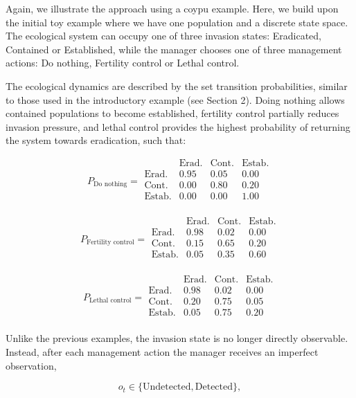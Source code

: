 \documentclass[
  11pt,
  a4paper,
]{article}
\begin{document}
Again, we illustrate the approach using a coypu example. Here, we build upon the initial toy example where we have one population and a discrete state space. The ecological system can occupy one of three invasion states: Eradicated, Contained or Established, while the manager chooses one of three management actions: Do nothing, Fertility control or Lethal control.

The ecological dynamics are described by the set transition probabilities, similar to those used in the introductory example (see Section 2). Doing nothing allows contained populations to become established, fertility control partially reduces invasion pressure, and lethal control provides the highest probability of returning the system towards eradication, such that:

\[
P_{\text{Do nothing}} =
\begin{array}{c|ccc}
 & \text{Erad.} & \text{Cont.} & \text{Estab.} \\
\hline
\text{Erad.} & 0.95 & 0.05 & 0.00 \\
\text{Cont.} & 0.00 & 0.80 & 0.20 \\
\text{Estab.} & 0.00 & 0.00 & 1.00 \\
\end{array}
\]

\[
P_{\text{Fertility control}} =
\begin{array}{c|ccc}
 & \text{Erad.} & \text{Cont.} & \text{Estab.} \\
\hline
\text{Erad.} & 0.98 & 0.02 & 0.00 \\
\text{Cont.} & 0.15 & 0.65 & 0.20 \\
\text{Estab.} & 0.05 & 0.35 & 0.60 \\
\end{array}
\]

\[
P_{\text{Lethal control}} =
\begin{array}{c|ccc}
 & \text{Erad.} & \text{Cont.} & \text{Estab.} \\
\hline
\text{Erad.} & 0.98 & 0.02 & 0.00 \\
\text{Cont.} & 0.20 & 0.75 & 0.05 \\
\text{Estab.} & 0.05 & 0.75 & 0.20 \\
\end{array}
\]

Unlike the previous examples, the invasion state is no longer directly observable. Instead, after each management action the manager receives an imperfect observation,

\[
o_t \in
\{\text{Undetected},
\text{Detected}\},
\]
\end{document}
